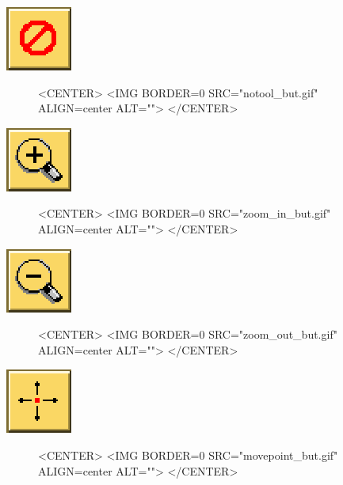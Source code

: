 \begin{ccTexOnly}
\mbox{\includegraphics{notool_but.eps}}
\end{ccTexOnly}
\begin{figure}
\begin{ccHtmlOnly}
<CENTER>
<IMG BORDER=0 SRC="notool_but.gif"  ALIGN=center  ALT="">
</CENTER>
\end{ccHtmlOnly}
\end{figure}

\begin{ccTexOnly}
\mbox{\includegraphics{zoom_in_but.eps}}
\end{ccTexOnly}
\begin{figure}
\begin{ccHtmlOnly}
<CENTER>
<IMG BORDER=0 SRC="zoom_in_but.gif"  ALIGN=center  ALT="">
</CENTER>
\end{ccHtmlOnly}
\end{figure}

\begin{ccTexOnly}
\mbox{\includegraphics{zoom_out_but.eps}}
\end{ccTexOnly}
\begin{figure}
\begin{ccHtmlOnly}
<CENTER>
<IMG BORDER=0 SRC="zoom_out_but.gif"  ALIGN=center  ALT="">
</CENTER>
\end{ccHtmlOnly}
\end{figure}

\begin{ccTexOnly}
\mbox{\includegraphics{movepoint_but.eps}}
\end{ccTexOnly}
\begin{figure}
\begin{ccHtmlOnly}
<CENTER>
<IMG BORDER=0 SRC="movepoint_but.gif"  ALIGN=center  ALT="">
</CENTER>
\end{ccHtmlOnly}
\end{figure}

